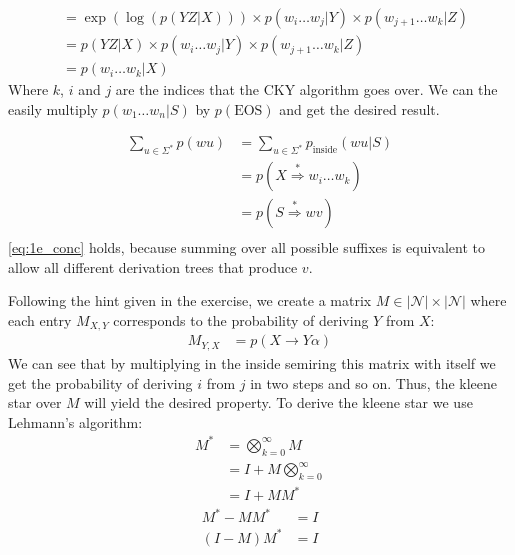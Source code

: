 \documentclass[a4paper,12pt]{ETHexercise}
\begin{document}
\begin{question}
\begin{subquestion}
\begin{align}
			                 & = \exp(\log(p(YZ | X))) \times p(w_i \dots w_j | Y) \times p(w_{j+1} \dots w_k | Z)                                    \\
			                 & = p(YZ | X) \times p(w_i \dots w_j | Y) \times p(w_{j+1} \dots w_k | Z)                                                \\
			                 & = p(w_i \dots w_k | X)
		\end{align}
		Where $k$, $i$ and $j$ are the indices that the CKY algorithm goes over.
		We can the easily multiply $p(w_1 \dots w_n | S)$ by $p(\text{EOS})$ and get the desired result.
	\end{subquestion}
	\begin{subquestion}
		\begin{align}
			\sum_{u \in \Sigma^*} p(wu) & = \sum_{u \in \Sigma^*} p_{\text{inside}}(wu | S)     \\
			                            & = p(X \overset{*}{\Rightarrow} w_i \dots w_k)         \\
			                            & = p(S \overset{*}{\Rightarrow} wv) \label{eq:1e_conc} \\
		\end{align}
		\cref*{eq:1e_conc} holds, because summing over all possible suffixes is equivalent to allow all different derivation trees that produce $v$.
	\end{subquestion}
	\begin{subquestion}
		Following the hint given in the exercise, we create a matrix $M \in |\mathcal{N}| \times |\mathcal{N}|$ where each entry $M_{X,Y}$ corresponds to the probability of deriving $Y$ from $X$:
		\begin{align}
			M_{Y,X} & = p(X \rightarrow Y\alpha)
		\end{align}
		We can see that by multiplying in the inside semiring this matrix with itself we get the probability of deriving $i$ from $j$ in two steps and so on. Thus, the kleene star over $M$ will yield the desired property. To derive the kleene star we use Lehmann's algorithm:
		\begin{align}
			M^* & =\bigotimes_{k=0}^{\infty} M      \\
			    & = I + M \bigotimes_{k=0}^{\infty} \\
			    & = I + MM^*
		\end{align}
		\begin{align}
			M^*  - MM^* & =I                                 \\
			(I- M)M^*   & = I                                \\

\end{align}
\end{subquestion}
\end{question}
\end{document}
